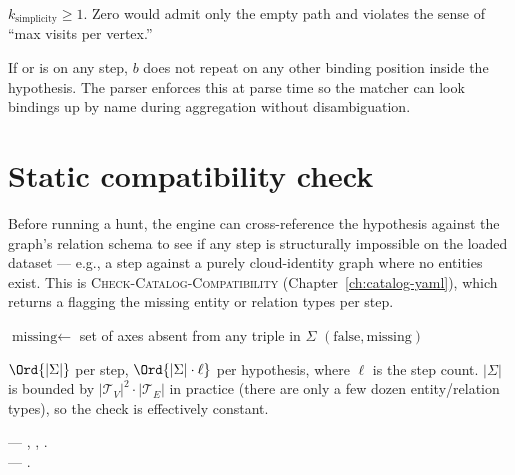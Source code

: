 \begin{invariant}
$k_{\text{simplicity}} \geq 1$. Zero would admit only the empty
path and violates the sense of ``max visits per vertex.''
\end{invariant}

\begin{invariant}
If  or  is 
on any step, $b$ does not repeat on any other binding position
inside the hypothesis. The parser enforces this at parse time so
the matcher can look bindings up by name during aggregation
without disambiguation.
\end{invariant}

\section{Static compatibility check}

Before running a hunt, the engine can cross-reference the
hypothesis against the graph's relation schema to see if any step
is structurally impossible on the loaded dataset --- e.g., a
 step against a purely cloud-identity
graph where no  entities exist. This is
\textsc{Check-Catalog-Compatibility} (Chapter~\ref{ch:catalog-yaml}),
which returns a  flagging the missing
entity or relation types per step.

\begin{algorithm}
\caption{\textsc{Check-Step-Compatibility}}\label{alg:check-step}
$\text{missing} \gets $ set of axes absent from any triple in $\Sigma$ \;
\Return $(\mathrm{false}, \text{missing})$\;
\end{algorithm}

\begin{complexity}
$\Ord{|\Sigma|}$ per step, $\Ord{|\Sigma| \cdot \ell}$ per
hypothesis, where $\ell$ is the step count. $|\Sigma|$ is bounded by
$|\mathcal{T}_V|^2 \cdot |\mathcal{T}_E|$ in practice (there are
only a few dozen entity/relation types), so the check is
effectively constant.
\end{complexity}

\begin{inthecode}
 --- ,
, .\\
 ---
.
\end{inthecode}
